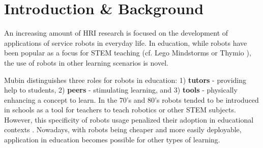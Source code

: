 \documentclass{sig-alternate-05-2015}
\begin{document}
%
%
%

%
%

%
%


\section{Introduction \& Background}
An increasing amount of HRI research is focused on the development of applications of service robots in everyday life. 
In education, while robots have been popular as a focus for STEM 
teaching (cf. Lego Mindstorms or Thymio \cite{riedo2012two}), the use of robots in other learning scenarios is novel. 

Mubin \cite{mubin2013review} distinguishes three roles for robots in education:
1) \textbf{tutors} - providing help to students, 2) \textbf{peers} - stimulating learning, and 3) \textbf{tools} - physically enhancing a concept to learn.
In the 70's and 80's robots tended to be introduced in schools as a tool for teachers to teach robotics or other STEM subjects. 
However, this specificity of robots usage penalized their adoption in educational contexts \cite{gander2013informatics}. 
Nowadays, with robots being cheaper and more easily deployable, application in education becomes possible for other types of learning.  
\end{document}
